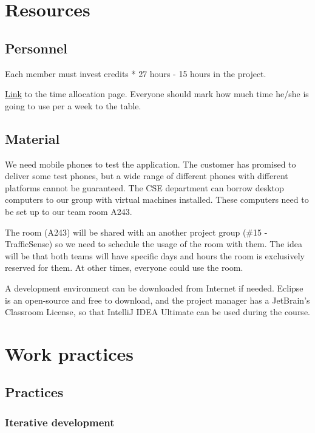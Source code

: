\section{Resources}
\subsection{Personnel}

Each member must invest credits * 27 hours - 15 hours in the project.

\href{https://docs.google.com/spreadsheet/ccc?key=0Ahu59q_GwtcedHI3MnJQM0NWZS11a
GxFTzFZeVEyQVE&usp=sharing}{Link} to the time allocation page. Everyone should 
mark how much time he/she is going to use per a week to the table.

\subsection{Material}

We need mobile phones to test the application. The customer has promised to 
deliver some test phones, but a wide range of different phones with different 
platforms cannot be guaranteed. The CSE department can borrow desktop computers 
to our group with virtual machines installed. These computers need to be set up 
to our team room A243.

The room (A243) will be shared with an another project group (\#15 - 
TrafficSense) so we need to schedule the usage of the room with them. The idea 
will be that both teams will have specific days and hours the room is 
exclusively reserved for them. At other times, everyone could use the room.

A development environment can be downloaded from Internet if needed. Eclipse is 
an open-source and free to download, and the project manager has a JetBrain's 
Classroom License, so that IntelliJ IDEA Ultimate can be used during the course.

\section{Work practices}
\subsection{Practices}
\subsubsection{Iterative development}

